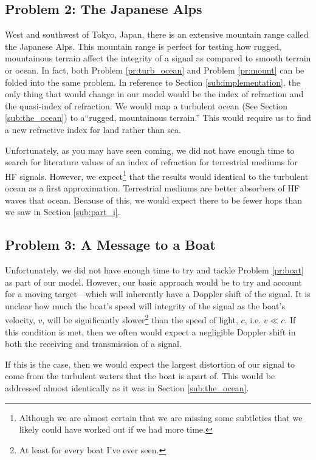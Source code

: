 \documentclass[11pt]{article}
\numberwithin{equation}{section}
\begin{document}
 \subsection{Problem 2: The Japanese Alps} %
 \label{sub:part_ii}
 West and southwest of Tokyo, Japan, there is an extensive mountain range called the Japanese Alps. This mountain range is perfect for testing how rugged, mountainous terrain affect the integrity of a signal as compared to smooth terrain or ocean. In fact, both Problem \ref{pr:turb_ocean} and Problem \ref{pr:mount} can be folded into the same problem. In reference to Section \ref{sub:implementation}, the only thing that would change in our model would be the index of refraction and the quasi-index of refraction. We would map a turbulent ocean (See Section \ref{sub:the_ocean}) to  a``rugged, mountainous terrain.'' This would require us to find a new refractive index for land rather than sea.

 Unfortunately, as you may have seen coming, we did not have enough time to search for literature values of an index of refraction for terrestrial mediums for HF signals. However, we expect\footnote{Although we are almost certain that we are missing some subtleties that we likely could have worked out if we had more time. }  that the results would identical to the turbulent ocean as a first approximation. Terrestrial mediums are better absorbers of HF waves that ocean. Because of this, we would expect there to be fewer hops than we saw in Section \ref{sub:part_i}.

 \subsection{Problem 3: A Message to a Boat} %
 \label{sub:part_iii}
 
 Unfortunately, we did not have enough time to try and tackle Problem \ref{pr:boat} as part of our model. However, our basic approach would be to try and account for a moving target---which will inherently have a Doppler shift of the signal.\cite{taylor2005classical} It is unclear how much the boat's speed will integrity of the signal as the boat's velocity, $v$, will be significantly slower\footnote{At least for every boat I've ever seen.} than the speed of light, $c$, i.e. $v\ll c$. If this condition is met, then we often would expect a negligible Doppler shift in both the receiving and transmission of a signal.

 If this is the case, then we would expect the largest distortion of our signal to come from the turbulent waters that the boat is apart of. This would be addressed almost identically as it was in Section \ref{sub:the_ocean}. 
\end{document}
